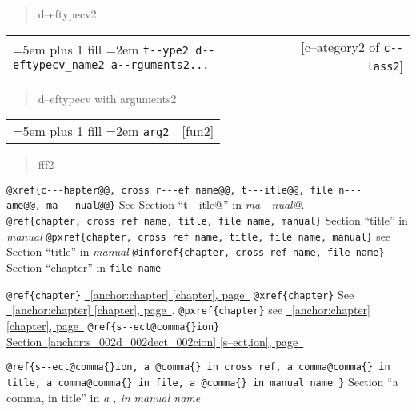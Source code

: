\documentclass{book}
\begin{document}
%
\begin{quote}
\unskip{\parskip=0pt\noindent}%
d--eftypecv2
\end{quote}


\noindent\begin{tabularx}{\linewidth}{@{}Xr}
\rightskip=5em plus 1 fill
\hangindent=2em
\texttt{t{-}{-}ype2 d{-}{-}eftypecv\_name2 a{-}{-}rguments2...}& [c--ategory2 of \texttt{c{-}{-}lass2}]
\end{tabularx}

%
\begin{quote}
\unskip{\parskip=0pt\noindent}%
d--eftypecv with arguments2
\end{quote}


\noindent\begin{tabularx}{\linewidth}{@{}Xr}
\rightskip=5em plus 1 fill
\hangindent=2em
\texttt{arg2}& [fun2]
\end{tabularx}

%
\begin{quote}
\unskip{\parskip=0pt\noindent}%
fff2
\end{quote}


\texttt{@xref\{c{-}{-}{-}hapter@@,\ cross r{-}{-}{-}ef name@@,\ t{-}{-}{-}itle@@,\ file n{-}{-}{-}ame@@,\ ma{-}{-}{-}nual@@\}} See Section ``t---itle@'' in \textsl{ma---nual@}.
\texttt{@ref\{chapter,\ cross ref name,\ title,\ file name,\ manual\}} Section ``title'' in \textsl{manual}
\texttt{@pxref\{chapter,\ cross ref name,\ title,\ file name,\ manual\}} see Section ``title'' in \textsl{manual}
\texttt{@inforef\{chapter,\ cross ref name,\ file name\}} Section ``chapter'' in \texttt{file name}

\texttt{@ref\{chapter\}} \hyperref[anchor:chapter]{\chaptername~\ref*{anchor:chapter} [chapter], page~\pageref*{anchor:chapter}}
\texttt{@xref\{chapter\}} See \hyperref[anchor:chapter]{\chaptername~\ref*{anchor:chapter} [chapter], page~\pageref*{anchor:chapter}}.
\texttt{@pxref\{chapter\}} see \hyperref[anchor:chapter]{\chaptername~\ref*{anchor:chapter} [chapter], page~\pageref*{anchor:chapter}}
\texttt{@ref\{s{-}{-}ect@comma\{\}ion\}} \hyperref[anchor:s_002d_002dect_002cion]{Section~\ref*{anchor:s_002d_002dect_002cion} [s--ect,ion], page~\pageref*{anchor:s_002d_002dect_002cion}}

\texttt{@ref\{s{-}{-}ect@comma\{\}ion,\ a @comma\{\}\ in cross
ref,\ a comma@comma\{\}\ in title,\ a comma@comma\{\}\ in file,\ a @comma\{\}\ in manual name \}}
Section ``a comma, in title'' in \textsl{a , in manual name}
\end{document}
